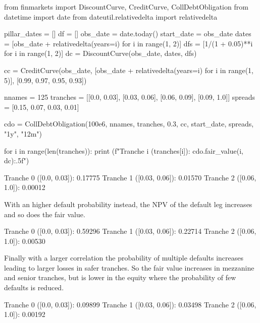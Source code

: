 \cprotEnv\begin{solution}

\begin{ipython}
from finmarkets import DiscountCurve, CreditCurve, CollDebtObligation
from datetime import date
from dateutil.relativedelta import relativedelta

pillar_dates = []
df = []
obs_date = date.today()
start_date = obs_date
dates = [obs_date + relativedelta(years=i) for i in range(1, 2)]
dfs = [1/(1 + 0.05)**i for i in range(1, 2)]
dc = DiscountCurve(obs_date, dates, dfs)

cc = CreditCurve(obs_date,
                 [obs_date + relativedelta(years=i) for i in range(1, 5)],
                 [0.99, 0.97, 0.95, 0.93])

nnames = 125
tranches = [[0.0, 0.03], [0.03, 0.06], [0.06, 0.09], [0.09, 1.0]]
spreads = [0.15, 0.07, 0.03, 0.01]

cdo = CollDebtObligation(100e6, nnames, tranches,
                         0.3, cc, start_date, spreads,
                         "1y", "12m")

for i in range(len(tranches)):
    print (f"Tranche {i} ({tranches[i]}): {cdo.fair_value(i, dc):.5f}")
\end{ipython}
\begin{ioutput}
Tranche 0 ([0.0, 0.03]): 0.17775
Tranche 1 ([0.03, 0.06]): 0.01570
Tranche 2 ([0.06, 1.0]): 0.00012
\end{ioutput}
With an higher default probability instead, the NPV of the default leg increases and so does the fair value.

\begin{ioutput}
Tranche 0 ([0.0, 0.03]): 0.59296
Tranche 1 ([0.03, 0.06]): 0.22714
Tranche 2 ([0.06, 1.0]): 0.00530
\end{ioutput}
Finally with a larger correlation the probability of multiple defaults increases leading to larger losses in safer tranches. So the fair value increases in mezzanine and senior tranches, but is lower in the equity where the probability of few defaults is reduced.

\begin{ioutput}
Tranche 0 ([0.0, 0.03]): 0.09899
Tranche 1 ([0.03, 0.06]): 0.03498
Tranche 2 ([0.06, 1.0]): 0.00192
\end{ioutput}
\end{solution}
